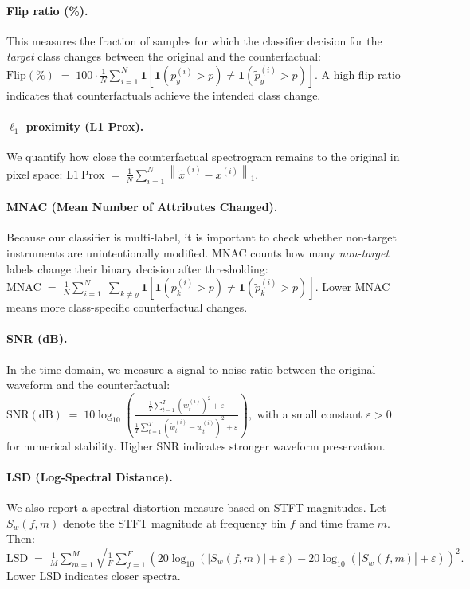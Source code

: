 \documentclass[11pt]{article}
\begin{document}
\paragraph{Flip ratio (\%).}
This measures the fraction of samples for which the classifier decision
for the \emph{target} class changes between the original and the
counterfactual:
$
\mathrm{Flip}(\%) \;=\;
100 \cdot \frac{1}{N}\sum_{i=1}^{N}\mathbf{1}\!\left[
  \mathbf{1}\!\left(p^{(i)}_{y}> p \right)\neq
  \mathbf{1}\!\left(\tilde p^{(i)}_{y}> p \right)
\right].
$
A high flip ratio indicates that counterfactuals achieve the intended
class change.

\paragraph{$\ell_1$ proximity (L1 Prox).}
We quantify how close the counterfactual spectrogram remains to the
original in pixel space:
$
\mathrm{L1\ Prox} \;=\; \frac{1}{N}\sum_{i=1}^{N}\left\lVert
\tilde{x}^{(i)} - x^{(i)} \right\rVert_{1}$.

\paragraph{MNAC (Mean Number of Attributes Changed).}
Because our classifier is multi-label, it is important to check whether
non-target instruments are unintentionally modified. MNAC counts how many
\emph{non-target} labels change their binary decision after thresholding:
$
\mathrm{MNAC} \;=\;
\frac{1}{N}\sum_{i=1}^{N}\;\sum_{k\neq y}
\mathbf{1}\!\left[
  \mathbf{1}\!\left(p^{(i)}_{k}> p \right)\neq
  \mathbf{1}\!\left(\tilde p^{(i)}_{k}> p \right)
\right].
$
Lower MNAC means more class-specific counterfactual changes.

\paragraph{SNR (dB).}
In the time domain, we measure a signal-to-noise ratio between the
original waveform and the counterfactual:
$
\mathrm{SNR(dB)} \;=\;
10\log_{10}\!\left(
  \frac{\frac{1}{T}\sum_{t=1}^{T}\left(w^{(i)}_t\right)^2+\varepsilon}
  {\frac{1}{T}\sum_{t=1}^{T}\left(\tilde
  w^{(i)}_t-w^{(i)}_t\right)^2+\varepsilon}
\right),
$
with a small constant $\varepsilon>0$ for numerical stability. Higher
SNR indicates stronger waveform preservation.

\paragraph{LSD (Log-Spectral Distance).}
We also report a spectral distortion measure based on STFT magnitudes.
Let $S_w(f,m)$ denote the STFT magnitude at frequency bin $f$ and time
frame $m$. Then:
$
\mathrm{LSD} \;=\;
\frac{1}{M}\sum_{m=1}^{M}\sqrt{\frac{1}{F}\sum_{f=1}^{F}\left(
    20\log_{10}\!\left(\left|S_{w}(f,m)\right|+\varepsilon\right)
    -
    20\log_{10}\!\left(\left|S_{\tilde w}(f,m)\right|+\varepsilon\right)
\right)^{2}}.
$
Lower LSD indicates closer spectra.
\end{document}

